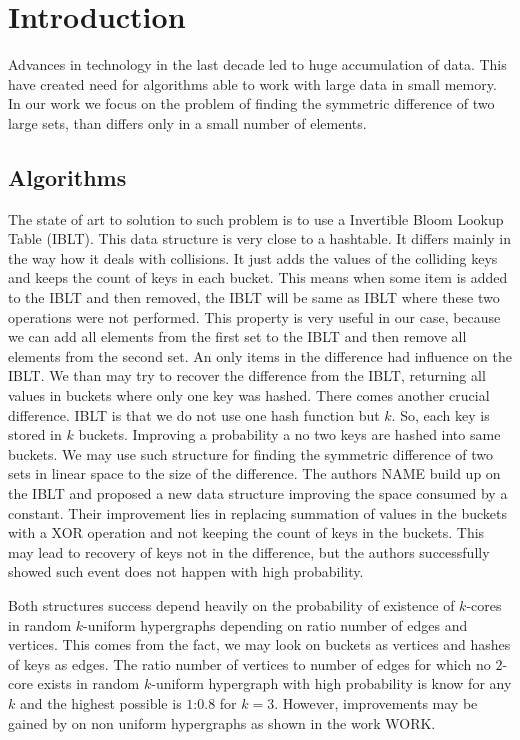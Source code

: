 \chapter*{Introduction}

Advances in technology in the last decade led to huge accumulation of data. 
This have created need for algorithms able to work with large data in small memory. 
In our work we focus on the problem of finding the symmetric difference of two large sets, 
than differs only in a small number of elements. 

\section*{Algorithms}

The state of art to solution to such problem is 
to use a Invertible Bloom Lookup Table (IBLT). This data structure is very close to a hashtable.
It differs mainly in the way how it deals with collisions. It just adds the values of the colliding keys and keeps the count of keys in each bucket.
This means when some item is added to the IBLT and then removed, the IBLT will be same as IBLT where these two operations were not performed.
This property is very useful in our case, because we can add all elements from the first set to the IBLT and then remove all elements from the second set. An only items 
in the difference had influence on the IBLT. We than may try to recover the difference from the IBLT, returning all values in buckets where only one key was hashed.
There comes another crucial difference. IBLT is that we do not use one hash function but $k$. So, each key is stored in $k$ buckets. 
Improving a probability a no two keys are hashed into same buckets.
We may use such structure for finding the symmetric difference of two sets in linear space to the size of the difference.
The authors NAME build up on the IBLT and proposed a new data structure improving the space consumed by a constant. 
Their improvement lies in replacing summation of values in the buckets with a XOR operation and not keeping the count of keys in the buckets.
This may lead to recovery of keys not in the difference, but the authors successfully showed such event does not happen with high probability.

Both structures success depend heavily on the probability of existence of $k$-cores in random $k$-uniform hypergraphs depending on ratio number of edges and vertices. This comes from the fact, we may look on buckets as vertices 
and hashes of keys as edges. The ratio number of vertices to number of edges for which no $2$-core exists
 in random $k$-uniform hypergraph with high probability is know for any $k$ and the highest possible is $1$:$0.8$ for $k = 3$.
However, improvements may be gained by on non uniform hypergraphs as shown in the work WORK.


